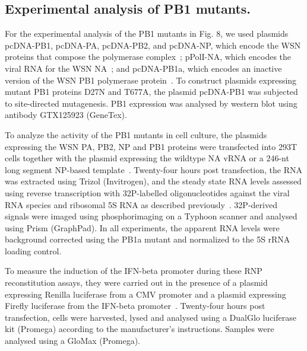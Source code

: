 \documentclass[]{article}
\begin{document}
\subsection*{Experimental analysis of PB1 mutants.}
For the experimental analysis of the PB1 mutants in Fig. 8, we used plasmids pcDNA-PB1, pcDNA-PA, pcDNA-PB2, and pcDNA-NP, which encode the WSN proteins that compose the polymerase complex~\cite{fodor2002single}; pPolI-NA, which encodes the viral RNA for the WSN NA~\cite{fodor2002single}; and pcDNA-PB1a, which encodes an inactive version of the WSN PB1 polymerase protein~\cite{vreede2004model}. 
To construct plasmids expressing mutant PB1 proteins D27N and T677A, the plasmid pcDNA-PB1 was subjected to site-directed mutagenesis. 
PB1 expression was analysed by western blot using antibody GTX125923 (GeneTex).

To analyze the activity of the PB1 mutants in cell culture, the plasmids expressing the WSN PA, PB2, NP and PB1 proteins were transfected into 293T cells together with the plasmid expressing the wildtype NA vRNA or a 246-nt long segment NP-based template~\cite{velthuis2018mini}.
Twenty-four hours post transfection, the RNA was extracted using Trizol (Invitrogen), and the steady state RNA levels assessed using reverse transcription with 32P-labelled oligonucleotides against the viral RNA species and ribosomal 5S RNA as described previously~\cite{velthuis2018mini, velthuis2016role}.
32P-derived signals were imaged using phosphorimaging on a Typhoon scanner and analysed using Prism (GraphPad).
In all experiments, the apparent RNA levels were background corrected using the PB1a mutant and normalized to the 5S rRNA loading control.

To measure the induction of the IFN-beta promoter during these RNP reconstitution assays, they were carried out in the presence of a plasmid expressing Renilla luciferase from a CMV promoter and a plasmid expressing Firefly luciferase from the IFN-beta promoter~\cite{velthuis2018mini}.
Twenty-four hours post transfection, cells were harvested, lysed and analysed using a DualGlo luciferase kit (Promega) according to the manufacturer’s instructions.
Samples were analysed using a GloMax (Promega).


\normalsize
\end{document}
